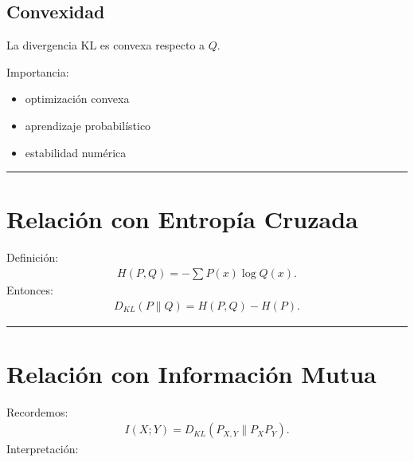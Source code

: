 \documentclass[letterpaper,10pt,english]{jupyterBook}
\begin{document}
\subsection{Convexidad}
\label{\detokenize{02_mathematical_foundations/kl_divergence:convexidad}}
\sphinxAtStartPar
La divergencia KL es convexa respecto a \(Q\).

\sphinxAtStartPar
Importancia:
\begin{itemize}
\item {} 
\sphinxAtStartPar
optimización convexa

\item {} 
\sphinxAtStartPar
aprendizaje probabilístico

\item {} 
\sphinxAtStartPar
estabilidad numérica

\end{itemize}


\bigskip\hrule\bigskip



\section{Relación con Entropía Cruzada}
\label{\detokenize{02_mathematical_foundations/kl_divergence:relacion-con-entropia-cruzada}}
\sphinxAtStartPar
Definición:
\begin{equation*}
\begin{split}
H(P,Q)=
-\sum P(x)\log Q(x).
\end{split}
\end{equation*}
\sphinxAtStartPar
Entonces:
\begin{equation*}
\begin{split}
D_{KL}(P\|Q)=H(P,Q)-H(P).
\end{split}
\end{equation*}

\bigskip\hrule\bigskip



\section{Relación con Información Mutua}
\label{\detokenize{02_mathematical_foundations/kl_divergence:relacion-con-informacion-mutua}}
\sphinxAtStartPar
Recordemos:
\begin{equation*}
\begin{split}
I(X;Y)=
D_{KL}(P_{X,Y}\|P_XP_Y).
\end{split}
\end{equation*}
\sphinxAtStartPar
Interpretación:
\end{document}
